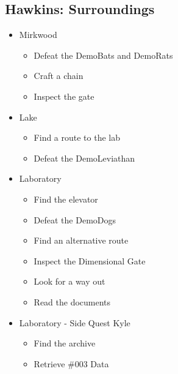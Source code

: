 \subsection{Hawkins: Surroundings}
\begin{itemize}
	\item Mirkwood
	\begin{itemize}
		\item Defeat the DemoBats and DemoRats
		\item Craft a chain
		\item Inspect the gate
	\end{itemize}
	\item Lake
	\begin{itemize}
		\item Find a route to the lab
		\item Defeat the DemoLeviathan
	\end{itemize}
	\item Laboratory
	\begin{itemize}
		\item Find the elevator
		\item Defeat the DemoDogs
		\item Find an alternative route
		\item Inspect the Dimensional Gate
		\item Look for a way out
		\item Read the documents
	\end{itemize}
	\item Laboratory - Side Quest Kyle
	\begin{itemize}
		\item Find the archive
		\item Retrieve \#003 Data
	\end{itemize}
\end{itemize}

